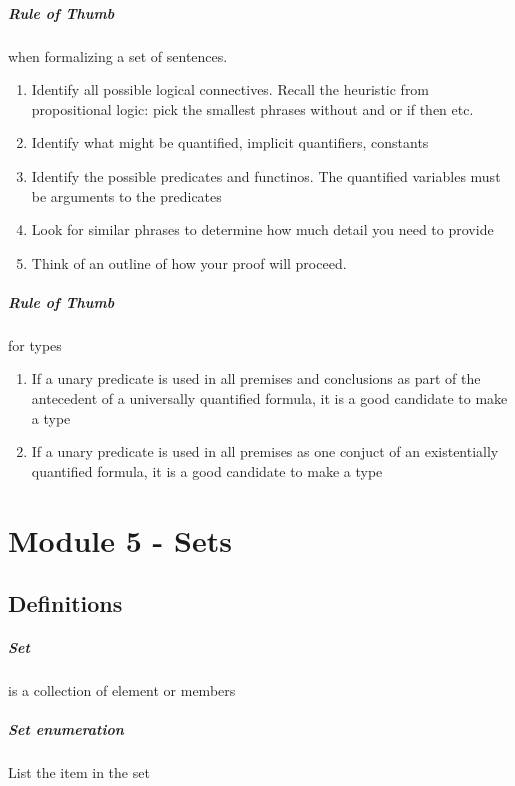 \documentclass[12pt]{report}
\begin{document}
    \paragraph{Rule of Thumb} when formalizing a set of sentences.
    \begin{enumerate}
      \item Identify all possible logical connectives. Recall the heuristic
        from propositional logic: pick the smallest phrases without and or if
        then etc.
      \item Identify what might be quantified, implicit quantifiers, constants
      \item Identify the possible predicates and functinos. The quantified
        variables must be arguments to the predicates
      \item Look for similar phrases to determine how much detail you need to
        provide
      \item Think of an outline of how your proof will proceed.
    \end{enumerate}

    \paragraph{Rule of Thumb} for types
    \begin{enumerate}
      \item If a unary predicate is used in all premises and conclusions as
        part of the antecedent of a universally quantified formula, it is a
        good candidate to make a type
      \item If a unary predicate is used in all premises as one conjuct of an
        existentially quantified formula, it is a good candidate to make a type
    \end{enumerate}

\chapter{Module 5 - Sets}
  \section{Definitions}
    \paragraph{Set} is a collection of element or members

    \paragraph{Set enumeration} List the item in the set
\end{document}
